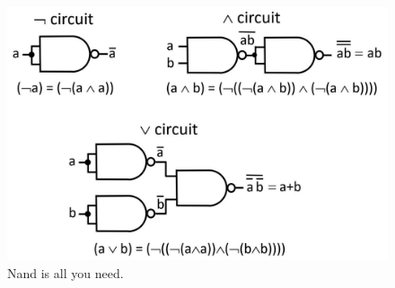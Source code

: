 \begin{figure}
\begin{center}
\includegraphics[scale=1]{images-cmyk/NandIsAllYouNeed}
\end{center}
\caption{Nand is all you need.}
\label{fig-02-nand-is-all-you-need}
\end{figure}

